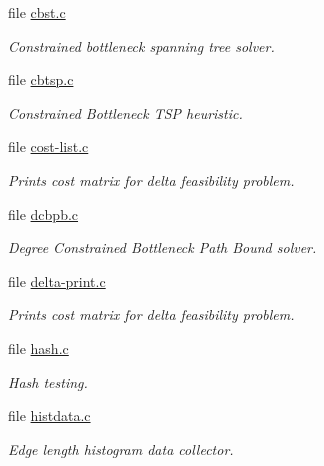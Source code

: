 \begin{CompactItemize}
\item 
file \hyperlink{bin_2cbst_8c}{cbst.c}
\begin{CompactList}\small\item\em Constrained bottleneck spanning tree solver. \item\end{CompactList}

\item 
file \hyperlink{cbtsp_8c}{cbtsp.c}
\begin{CompactList}\small\item\em Constrained Bottleneck TSP heuristic. \item\end{CompactList}

\item 
file \hyperlink{cost-list_8c}{cost-list.c}
\begin{CompactList}\small\item\em Prints cost matrix for delta feasibility problem. \item\end{CompactList}

\item 
file \hyperlink{bin_2dcbpb_8c}{dcbpb.c}
\begin{CompactList}\small\item\em Degree Constrained Bottleneck Path Bound solver. \item\end{CompactList}

\item 
file \hyperlink{delta-print_8c}{delta-print.c}
\begin{CompactList}\small\item\em Prints cost matrix for delta feasibility problem. \item\end{CompactList}

\item 
file \hyperlink{bin_2hash_8c}{hash.c}
\begin{CompactList}\small\item\em Hash testing. \item\end{CompactList}

\item 
file \hyperlink{histdata_8c}{histdata.c}
\begin{CompactList}\small\item\em Edge length histogram data collector. \item\end{CompactList}


\end{CompactItemize}
